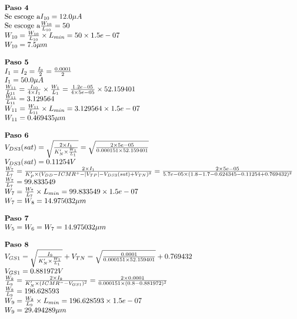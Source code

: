 \begin{equation*}
	\begin{array}{l l}
		\textbf{Paso 4} \\
		\text{Se escoge a} I_{10} =  12.0  \mu A \\
		\text{Se escoge a} \frac{W_{10}}{L_{10}} =  50  \\
		W_{10} = \frac{W_{10}}{L_{10}} \times L_{min} =  50 \times 1.5e-07  \\
		W_{10} =  7.5  \mu m \\
		\\
		\textbf{Paso 5} \\
		I_{1} = I_{2} = \frac{I_{9}}{2} = \frac{ 0.0001 }{2} \\
		I_{1} =  50.0 \mu A \\
		\frac{W_{11}}{L_{11}} = \frac{I_{10}}{4\times I_{1}}\times \frac{W_1}{L_1}= \frac{ 1.2e-05 }{4\times 5e-05 }\times 52.159401  \\
		\frac{W_{11}}{L_{11}} =  3.129564  \\
		W_{11} = \frac{W_{11}}{L_{11}} \times L_{min} =  3.129564 \times 1.5e-07  \\
		W_{11} =  0.469435  \mu m \\
		\\
		\textbf{Paso 6} \\
		V_{DS3}(sat) = \sqrt{\frac{2\times I_{1}}{K'_{N}\times\frac{W_{1}}{L_{1}}}} = \sqrt{\frac{2\times 5e-05 }{ 0.000151 \times 52.159401 }} \\
		V_{DS3}(sat) =  0.11254  V \\
		\frac{W_7}{L_7} = \frac{2\times I_{1}}{K'_{P}\times (V_{DD}-ICMR^{+}-|V_{TP}|-V_{DS3}(sat)+V_{TN})^{2}} = \frac{2\times 5e-05 }{ 5.7e-05 \times ( 1.8 - 1.7 - 0.624345 - 0.11254 + 0.769432 )^{2}} \\
		\frac{W_7}{L_7} =  99.833549  \\
		W_{7} = \frac{W_7}{L_7} \times L_{min} =  99.833549 \times 1.5e-07  \\
		W_{7} = W_{8} =  14.975032  \mu m \\
		\\
		\textbf{Paso 7} \\
		W_{5} = W_{6} = W_{7} =  14.975032  \mu m \\
		\\
		\textbf{Paso 8} \\
		V_{GS1} = \sqrt{\frac{I_{9}}{K'_{N}\times\frac{W_{1}}{L_{1}}}}+V_{TN} = \sqrt{\frac{ 0.0001 }{ 0.000151 \times 52.159401 }}+ 0.769432  \\
		V_{GS1} =  0.881972  V \\
		\frac{W_9}{L_9} = \frac{2\times I_{9}}{K'_{N}\times (ICMR^{-}-V_{{GS1}})^{2}} = \frac{2\times 0.0001 }{ 0.000151 \times ( 0.8 - 0.881972 )^{2}} \\
		\frac{W_9}{L_9} =  196.628593  \\
		W_{9} = \frac{W_9}{L_9} \times L_{min} =  196.628593 \times 1.5e-07  \\
		W_{9} =  29.494289  \mu m \\
	\end{array}
\end{equation*}

